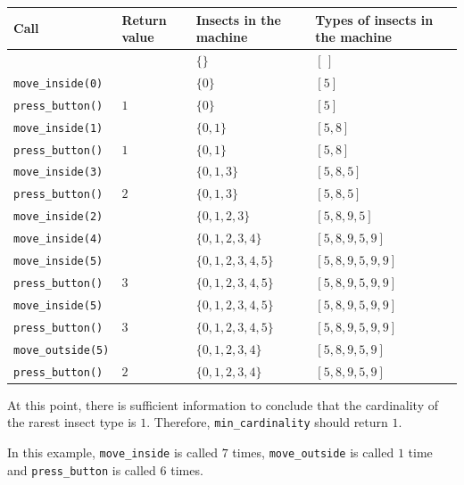 \begin{center}
\begin{tabular}{| l | l | l | l |}
  \hline
  \textbf{Call} & \textbf{Return value} & \textbf{Insects in the machine} &
  \textbf{Types of insects in the machine} \\ \hline
  & & $\{\}$ & $[\,]$ \\ \hline
  \texttt{move\_inside(0)}  &     & $\{0\}$           & $[5]$ \\ \hline
  \texttt{press\_button()}  & $1$ & $\{0\}$           & $[5]$ \\ \hline
  \texttt{move\_inside(1)}  &     & $\{0, 1\}$        & $[5, 8]$ \\ \hline
  \texttt{press\_button()}  & $1$ & $\{0, 1\}$        & $[5, 8]$ \\ \hline
  \texttt{move\_inside(3)}  &     & $\{0, 1, 3\}$     & $[5, 8, 5]$ \\ \hline
  \texttt{press\_button()}  & $2$ & $\{0, 1, 3\}$     & $[5, 8, 5]$ \\ \hline
  \texttt{move\_inside(2)}  &     & $\{0, 1, 2, 3\}$  & $[5, 8, 9, 5]$ \\ \hline
  \texttt{move\_inside(4)}  &     & $\{0, 1, 2, 3, 4\}$ & $[5, 8, 9, 5, 9]$ \\ \hline
  \texttt{move\_inside(5)}  &     & $\{0, 1, 2, 3, 4, 5\}$ & $[5, 8, 9, 5, 9, 9]$ \\ \hline
  \texttt{press\_button()}  & $3$ & $\{0, 1, 2, 3, 4, 5\}$ & $[5, 8, 9, 5, 9, 9]$ \\ \hline
  \texttt{move\_inside(5)}  &     & $\{0, 1, 2, 3, 4, 5\}$ & $[5, 8, 9, 5, 9, 9]$ \\ \hline
  \texttt{press\_button()}  & $3$ & $\{0, 1, 2, 3, 4, 5\}$ & $[5, 8, 9, 5, 9, 9]$ \\ \hline
  \texttt{move\_outside(5)} &     & $\{0, 1, 2, 3, 4\}$ & $[5, 8, 9, 5, 9]$ \\ \hline
  \texttt{press\_button()}  & $2$ & $\{0, 1, 2, 3, 4\}$ & $[5, 8, 9, 5, 9]$ \\ \hline
\end{tabular}
\end{center}

\noindent
At this point, there is sufficient information to conclude that the cardinality of the rarest insect
type is $1$. Therefore, \texttt{min\_cardinality} should return $1$.

In this example, \texttt{move\_inside} is called $7$ times, \texttt{move\_outside} is called $1$ time
and \texttt{press\_button} is called $6$ times.
